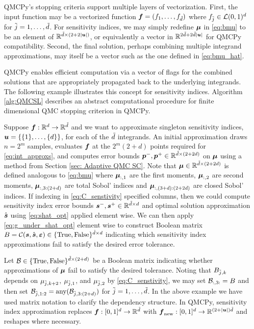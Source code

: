 \documentclass{article}[12pt]
\begin{document}
QMCPy's stopping criteria support multiple layers of vectorization. First, the input function may be a vectorized function $\bf = (f_1,\dots,f_{\dtilde} )$ where $f_{\tilde{j}} \in \calL(0,1)^d$ for $\tilde{j}=1,\dots,\dtilde$. For sensitivity indices, we may simply redefine $\bmu$ in \eqref{eq:bmu} to be an element of $\bbR^{\dtilde \times (2+2\lvert \bu \rvert)}$, or equivalently a vector in $\bbR^{2\dtilde+2\dtilde\lvert \bu \rvert}$ for QMCPy compatibility. Second, the final solution, perhaps combining multiple integrand approximations, may itself be a vector such as the one defined in  \eqref{eq:bmu_hat}.

QMCPy enables efficient computation via a vector of flags for the combined solutions that are appropriately propagated back to the underlying integrands. The following example illustrates this concept for sensitivity indices. Algorithm \ref{alg:QMCSL} describes an abstract computational procedure for finite dimensional QMC stopping criterion in QMCPy.

Suppose $\bf:\bbR^d \to \bbR^{\dtilde}$ and we want to approximate singleton sensitivity indices, $\bu = \{ \{1\}, \dots, \{d\} \}$, for each of the $\dtilde$ integrands. An initial approximation draws $n=2^m$ samples, evaluates $\bf$ at the $2^m(2+d)$ points required for \eqref{eq:int_approxs}, and computes error bounds $\bp^-,\bp^+ \in \bbR^{\dtilde \times (2+2d)}$ on $\bmu$ using a method from  Section \ref{sec: Adaptive QMC SC}. Note that $\bmu \in \bbR^{\dtilde \times (2+2d)}$ is defined analogous to \eqref{eq:bmu} where $\bmu_{:,1}$ are the first moments, $\bmu_{:,2}$ are second moments, $\bmu_{:,3:(2+d)}$ are total Sobol' indices and $\bmu_{:,(3+d):(2+2d)}$ are closed Sobol' indices. If indexing in \eqref{eq:C_senstivity} specified columns, then we could compute sensitivity index error bounds $\bs^-,\bs^+ \in \bbR^{\dtilde \times d}$ and optimal solution approximation $\hat{\bs}$ using \eqref{eq:shat_opt} applied element wise.  We can then apply \eqref{eq:g_under_shat_opt} element wise to construct Boolean matrix $B = \calC(\bs,\hat{\bs},\bvarepsilon) \in \{\True,\False\}^{\dtilde \times d}$ indicating which sensitivity index approximations fail to satisfy the desired error tolerance. 

Let $\calB \in \{\True,\False\}^{\dtilde \times (2+d)}$ be a Boolean matrix indicating whether approximations of $\bmu$ fail to satisfy the desired tolerance. Noting that $B_{\jtilde,k}$  depends on $\mu_{\jtilde,k+2}$, $\mu_{\jtilde,1}$, and $\mu_{\jtilde,2}$ by \eqref{eq:C_senstivity}, we may set $\calB_{:,3:}=B$ and then set $\calB_{\jtilde,1:2} = \text{any}(\calB_{\jtilde,3:(2+d)})$ for $\jtilde=1,\dots,\dtilde$. In the above example we have used matrix notation to clarify the dependency structure. In QMCPy, sensitivity index approximation replaces 
$\bf : [0,1]^d \to \bbR^{\dtilde}$ with
$\bf_{\text{new}}: [0,1]^d \to \bbR^{(2+\lvert \bu \rvert)\dtilde}$
and reshapes where necessary.
\end{document}
